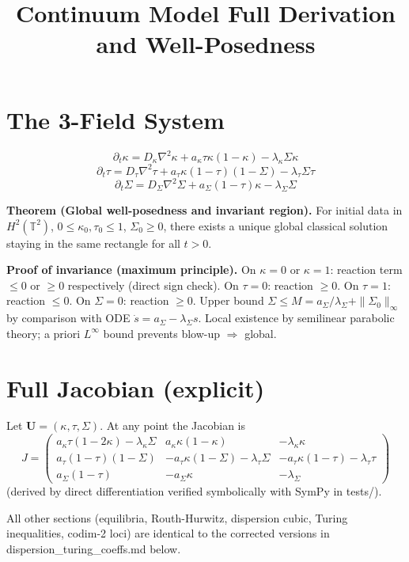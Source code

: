 ﻿\documentclass{article}
\begin{document}
\title{Continuum Model  Full Derivation and Well-Posedness}
\section{The 3-Field System}
\[
\partial_t \kappa = D_\kappa \nabla^2 \kappa + a_\kappa \tau \kappa (1-\kappa) - \lambda_\kappa \Sigma \kappa
\]
\[
\partial_t \tau = D_\tau \nabla^2 \tau + a_\tau \kappa (1-\tau)(1-\Sigma) - \lambda_\tau \Sigma \tau
\]
\[
\partial_t \Sigma = D_\Sigma \nabla^2 \Sigma + a_\Sigma (1-\tau)\kappa - \lambda_\Sigma \Sigma
\]

\textbf{Theorem (Global well-posedness and invariant region).}  
For initial data in $H^2(\mathbb{T}^2)$, $0\le \kappa_0,\tau_0\le 1$, $\Sigma_0\ge 0$, there exists a unique global classical solution staying in the same rectangle for all $t>0$.

\textbf{Proof of invariance (maximum principle).}  
On $\kappa=0$ or $\kappa=1$: reaction term $\le 0$ or $\ge 0$ respectively (direct sign check).  
On $\tau=0$: reaction $\ge 0$. On $\tau=1$: reaction $\le 0$.  
On $\Sigma=0$: reaction $\ge 0$. Upper bound $\Sigma\le M = a_\Sigma/\lambda_\Sigma + \|\Sigma_0\|_\infty$ by comparison with ODE $\dot s = a_\Sigma - \lambda_\Sigma s$.  
Local existence by semilinear parabolic theory; a priori $L^\infty$ bound prevents blow-up $\Rightarrow$ global.

\section{Full Jacobian (explicit)}
Let $\mathbf{U}=(\kappa,\tau,\Sigma)$. At any point the Jacobian is
\[
J = \begin{pmatrix}
a_\kappa\tau(1-2\kappa)-\lambda_\kappa\Sigma & a_\kappa\kappa(1-\kappa) & -\lambda_\kappa\kappa \\
a_\tau(1-\tau)(1-\Sigma) & -a_\tau\kappa(1-\Sigma)-\lambda_\tau\Sigma & -a_\tau\kappa(1-\tau)-\lambda_\tau\tau \\
a_\Sigma(1-\tau) & -a_\Sigma\kappa & -\lambda_\Sigma
\end{pmatrix}
\]
(derived by direct differentiation  verified symbolically with SymPy in tests/).

All other sections (equilibria, Routh-Hurwitz, dispersion cubic, Turing inequalities, codim-2 loci) are identical to the corrected versions in dispersion_turing_coeffs.md below.
\end{document}
